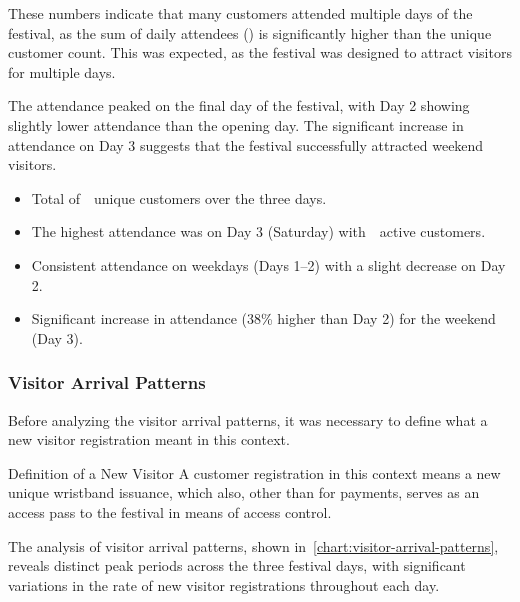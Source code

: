 These numbers indicate that many customers attended multiple days of the festival, as the sum of daily attendees () is significantly higher than the unique customer count.
This was expected, as the festival was designed to attract visitors for multiple days.

The attendance peaked on the final day of the festival, with Day 2 showing slightly lower attendance than the opening day.
The significant increase in attendance on Day 3 suggests that the festival successfully attracted weekend visitors.

\begin{keytakeaways}
	\begin{itemize}
		\item Total of~~unique customers over the three days.
		\item The highest attendance was on Day 3 (Saturday) with~~active customers.
		\item Consistent attendance on weekdays (Days 1–2) with a slight decrease on Day 2.
		\item Significant increase in attendance (38\% higher than Day 2) for the weekend (Day 3).
	\end{itemize}
\end{keytakeaways}


\subsubsection{Visitor Arrival Patterns}
\label{subsubsec:analysis-visitor-patterns}


Before analyzing the visitor arrival patterns, it was necessary to define what a new visitor registration meant in this context.

\begin{infobox}{Definition of a New Visitor}
	A customer registration in this context means a new unique wristband issuance, which also, other than for payments, serves as an access pass to the festival in means of access control.
\end{infobox}

The analysis of visitor arrival patterns, shown in~\autoref{chart:visitor-arrival-patterns}, reveals distinct peak periods across the three festival days, with significant variations in the rate of new visitor registrations throughout each day.

